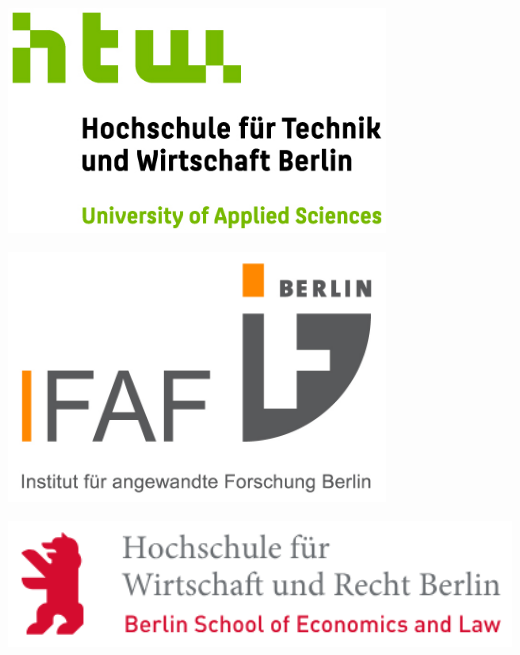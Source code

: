 \documentclass[a0,portrait]{a0poster}
\begin{document}
\vspace{3cm}

\begin{minipage}[b]{0.33\linewidth}
\includegraphics[width=10cm,left]{htw_logo.jpg}
\end{minipage}
\begin{minipage}[b]{0.34\linewidth}
\includegraphics[width=10cm,center]{ifaf_logo.jpg}
\end{minipage}
\begin{minipage}[b]{0.33\linewidth}
\includegraphics[width=15cm,right]{hwr_logo.png}
\end{minipage}
\end{document}
